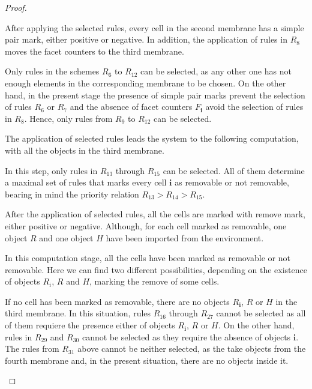 \documentclass[journal]{IEEEtran}
\begin{document}
\begin{proof}
\begin{list}{\textbf{Step }}{}
After applying the selected rules, every cell in the second membrane has a
simple pair mark, either positive or negative. In addition, the application of
rules in $R_8$ moves the facet counters to the third membrane.
\item Only rules in the schemes $R_6$ to $R_{12}$ can
be selected, as any other one has not enough elements in the corresponding
membrane to be chosen. On the other hand, in the present stage the presence of
simple pair marks prevent the selection of rules $R_6$ or $R_7$ and the absence
of facet counters $F_\mathbf{i}$ avoid the selection of rules in $R_8$. Hence,
only rules from $R_9$ to $R_{12}$ can be selected.

The application of selected rules leads the system to the following computation,
with all the objects in the third membrane.
\item In this step, only rules in $R_{13}$ through $R_{15}$ can be selected. All
of them determine a maximal set of rules that marks every cell $\mathbf{i}$ as
removable or not removable, bearing in mind the priority relation $R_{13} >
R_{14} > R_{15}$.

After the application of selected rules, all the cells are marked with remove
mark, either positive or negative. Although, for each cell marked as removable,
one object $R$ and one object $H$ have been imported from the environment.
\item In this computation stage, all the cells have been marked as removable or
not removable. Here we can find two different possibilities, depending on the
existence of objects $R_i$, $R$ and $H$, marking the remove of some cells.
\begin{list}{)}{}
\item If no cell has been marked as removable, there are no objects
$R_\mathbf{i}$, $R$ or $H$ in the third membrane. In this situation, rules
$R_{16}$ through $R_{27}$ cannot be selected as all of them requiere the
presence either of objects $R_\mathbf{i}$, $R$ or $H$. On the other hand, rules
in $R_{29}$ and $R_{30}$ cannot be selected as they require the absence of
objects $\mathbf{i}$. The rules from $R_{31}$ above cannot be neither selected,
as the take objects from the fourth membrane and, in the present situation,
there are no objects inside it.


\end{list}
\end{list}
\end{proof}
\end{document}
